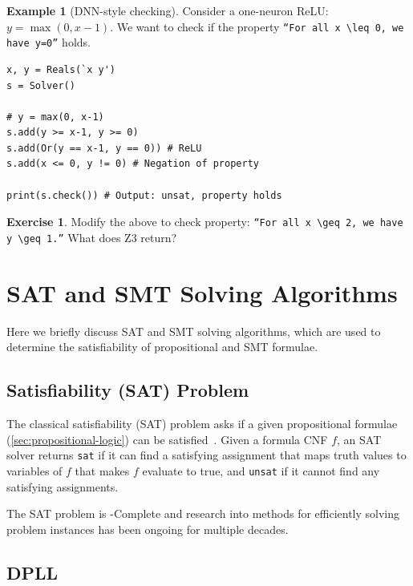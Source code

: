 \documentclass[oneside,11pt,dvipsnames]{book}
\numberwithin{equation}{section}
\theoremstyle{definition}
\newtheorem{example}{Example}[section]
\newtheorem{exercise}{Exercise}[section]
\theoremstyle{remark}
\newcommand{\sat}{\texttt{sat}}
\newcommand{\unsat}{\texttt{unsat}}
\begin{document}
\begin{example}[DNN-style checking]
Consider a one-neuron ReLU: $y = \max(0, x - 1)$.  
We want to check if the property \texttt{``For all $x \leq 0$, we have $y=0$''} holds.


\begin{lstlisting}
x, y = Reals(`x y')
s = Solver()

# y = max(0, x-1)
s.add(y >= x-1, y >= 0)
s.add(Or(y == x-1, y == 0)) # ReLU
s.add(x <= 0, y != 0) # Negation of property

print(s.check()) # Output: unsat, property holds
\end{lstlisting}
\end{example}


\begin{exercise}
Modify the above to check property:  
\texttt{``For all $x \geq 2$, we have $y \geq 1$.''}  
What does Z3 return?
\end{exercise}


\section{SAT and SMT Solving Algorithms}\label{sec:sat-smt-algorithms}

Here we briefly discuss SAT and SMT solving algorithms, which are used to determine the satisfiability of propositional and SMT formulae.

\subsection{Satisfiability (SAT) Problem}\label{sec:sat-problem}
The classical satisfiability (SAT) problem asks if a given propositional formulae (\autoref{sec:propositional-logic}) can be satisfied~\cite{biere2009handbook}.  Given a formula CNF $f$, an SAT solver returns \sat{} if it can find a satisfying assignment that maps truth values to variables of $f$ that makes $f$ evaluate to true, and \unsat{} if it cannot find any satisfying assignments.

The SAT problem is \NP-Complete and research into methods for efficiently solving  problem instances has been ongoing for multiple decades.


\subsection{DPLL}
\end{document}
